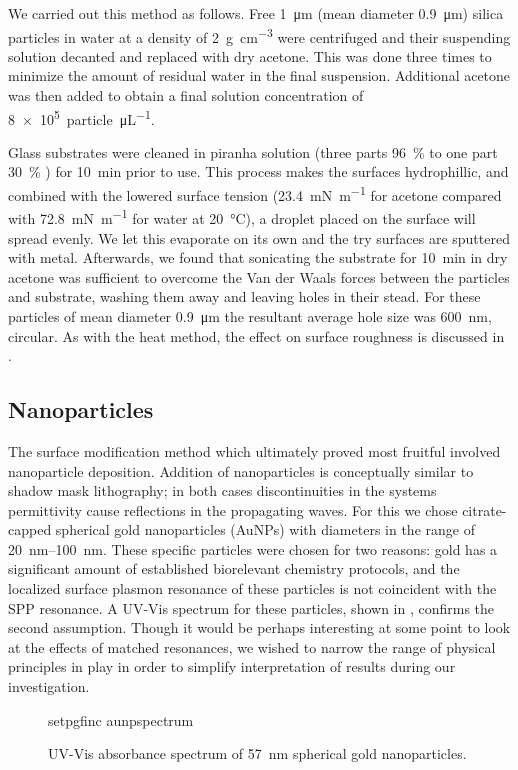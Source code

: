 We carried out this method as follows.  Free \SI{1}{\micro\meter} (mean
diameter \SI{0.9}{\micro\meter}) silica particles in water at a density of
\SI{2}{\gram\per\centi\meter\cubed} were centrifuged and their suspending
solution decanted and replaced with dry acetone.  This was done three times
to minimize the amount of residual water in the final suspension.
Additional acetone was then added to obtain a final solution concentration
of \SI{8e5}{particle\per\micro\liter}.  

Glass substrates were cleaned in piranha solution (three parts
\SI{96}{\percent}  to one part \SI{30}{\percent} ) for
\SI{10}{\minute} prior to use.  This process makes the surfaces
hydrophillic, and combined with the lowered surface tension
(\SI{23.4}{\milli\newton\per\meter} for acetone compared with
\SI{72.8}{\milli\newton\per\meter} for water at \SI{20}{\celsius}), a
droplet placed on the surface will spread evenly.  We let this evaporate on
its own and the try surfaces are sputtered with metal.  Afterwards, we
found that sonicating the substrate for \SI{10}{\minute} in dry acetone was
sufficient to overcome the Van der Waals forces between the particles and
substrate, washing them away and leaving holes in their stead.  For these
particles of mean diameter \SI{0.9}{\micro\meter} the resultant average
hole size was \SI{600}{\nano\meter}, circular.  As with the heat method,
the effect on surface roughness is discussed in
.

\subsection{Nanoparticles}
The surface modification method which ultimately proved most fruitful
involved nanoparticle deposition.  Addition of nanoparticles is
conceptually similar to shadow mask lithography; in both cases
discontinuities in the systems permittivity cause reflections in the
propagating waves.  For this we chose citrate-capped spherical gold
nanoparticles (AuNPs) with diameters in the range of
\SIrange{20}{100}{\nano\meter}.  These specific particles were chosen for
two reasons: gold has a significant amount of established biorelevant
chemistry protocols, and the localized surface plasmon resonance of these
particles is not coincident with the SPP resonance.  A UV-Vis spectrum for
these particles, shown in , confirms the second
assumption.  Though it would be perhaps interesting at some point to look
at the effects of matched resonances, we wished to narrow the range of
physical principles in play in order to simplify interpretation of results
during our investigation.
\begin{figure}[ht]
 \centering
 {setpgfinc}
 {aunpspectrum}
 \caption{UV-Vis absorbance spectrum of \SI{57}{\nano\meter} spherical gold
 nanoparticles.}
 \label{fig:aunpspectrum}
\end{figure}

